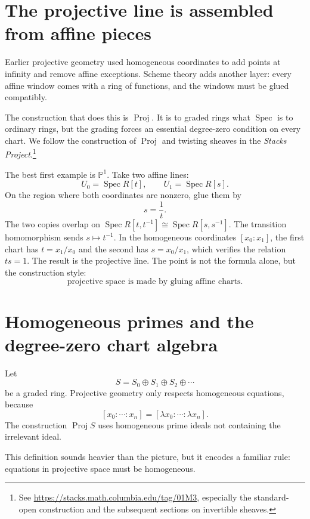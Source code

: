 
\section{The projective line is assembled from affine pieces}

Earlier projective geometry used homogeneous coordinates to add points at infinity and remove affine exceptions. Scheme theory adds another layer: every affine window comes with a ring of functions, and the windows must be glued compatibly.

The construction that does this is \(\operatorname{Proj}\). It is to graded rings what \(\operatorname{Spec}\) is to ordinary rings, but the grading forces an essential degree-zero condition on every chart. We follow the construction of \(\operatorname{Proj}\) and twisting sheaves in the \emph{Stacks Project}.\footnote{See \url{https://stacks.math.columbia.edu/tag/01M3}, especially the standard-open construction and the subsequent sections on invertible sheaves.}

The best first example is \(\mathbb P^1\). Take two affine lines:
\[
  U_0=\operatorname{Spec}R[t],
  \qquad
  U_1=\operatorname{Spec}R[s].
\]
On the region where both coordinates are nonzero, glue them by
\[
  s=\frac1t.
\]
The two copies overlap on \(\operatorname{Spec}R[t,t^{-1}]\cong\operatorname{Spec}R[s,s^{-1}]\). The transition homomorphism sends \(s\mapsto t^{-1}\). In the homogeneous coordinates \([x_0:x_1]\), the first chart has \(t=x_1/x_0\) and the second has \(s=x_0/x_1\), which verifies the relation \(ts=1\). The result is the projective line. The point is not the formula alone, but the construction style:
\[
  \text{projective space is made by gluing affine charts.}
\]

\section{Homogeneous primes and the degree-zero chart algebra}

Let
\[
  S=S_0\oplus S_1\oplus S_2\oplus\cdots
\]
be a graded ring. Projective geometry only respects homogeneous equations, because
\[
  [x_0:\cdots:x_n]=[\lambda x_0:\cdots:\lambda x_n].
\]
The construction \(\operatorname{Proj}S\) uses homogeneous prime ideals not containing the irrelevant ideal.

This definition sounds heavier than the picture, but it encodes a familiar rule: equations in projective space must be homogeneous.

